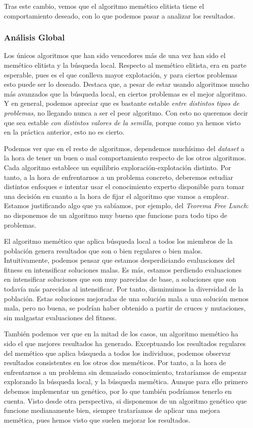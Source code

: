 \documentclass[11pt]{article}
\begin{document}
Tras este cambio, vemos que el algoritmo memético elitista tiene el comportamiento deseado, con lo que podemos pasar a analizar los resultados.

\subsubsection{Análisis Global}

Los únicos algoritmos que han sido vencedores más de una vez han sido el memético elitista y la búsqueda local. Respecto al memético elitista, era en parte esperable, pues es el que conlleva mayor explotación, y para ciertos problemas esto puede ser lo deseado. Destaca que, a pesar de estar usando algoritmos mucho más avanzados que la búsqueda local, en ciertos problemas es el mejor algoritmo. Y en general, podemos apreciar que es bastante estable \emph{entre distintos tipos de problemas}, no llegando nunca a ser el peor algoritmo. Con esto no queremos decir que sea estable \emph{con distintos valores de la semilla}, porque como ya hemos visto en la práctica anterior, esto no es cierto.

Podemos ver que en el resto de algoritmos, dependemos muchísimo del \emph{dataset} a la hora de tener un buen o mal comportamiento respecto de los otros algoritmos. Cada algoritmo establece un equilibrio exploración-explotación distinto. Por tanto, a la hora de enfrentarnos a un problema concreto, deberemos estudiar distintos enfoques e intentar usar el conocimiento experto disponible para tomar una decisión en cuanto a la hora de fijar el algoritmo que vamos a emplear. Estamos justificando algo que ya sabíamos, por ejemplo, del \emph{Teorema Free Lunch}: no disponemos de un algoritmo muy bueno que funcione para todo tipo de problemas.

El algoritmo memético que aplica búsqueda local a todos los miembros de la población genera resultados que son o bien regulares o bien malos. Intuitivamente, podemos pensar que estamos desperdiciando evaluaciones del fitness en intensificar soluciones malas. Es más, estamos perdiendo evaluaciones en intensificar soluciones que son muy parecidas de base, a soluciones que son todavía más parecidas al intensificar. Por tanto, disminuimos la diversidad de la población. Estas soluciones mejoradas de una solución mala a una solución menos mala, pero no buena, se podrían haber obtenido a partir de cruces y mutaciones, sin malgastar evaluaciones del fitness.

También podemos ver que en la mitad de los casos, un algoritmo memético ha sido el que mejores resultados ha generado. Exceptuando los resultados regulares del memético que aplica búsqueda a todos los individuos, podemos observar resultados consistentes en los otros dos meméticos. Por tanto, a la hora de enfrentarnos a un problema sin demasiado conocimiento, trataríamos de empezar explorando la búsqueda local, y la búsqueda memética. Aunque para ello primero debemos implementar un genético, por lo que también podríamos tenerlo en cuenta. Visto desde otra perspectiva, si disponemos de un algoritmo genético que funcione medianamente bien, siempre trataríamos de aplicar una mejora memética, pues hemos visto que suelen mejorar los resultados.
\end{document}
